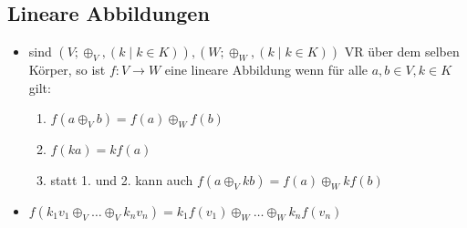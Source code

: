 \documentclass[10pt,a4paper]{article}
\begin{document}
\subsection{Lineare Abbildungen}
\begin{itemize}
\item sind $(V; \oplus_{V}, (k\mid k\in K)),(W; \oplus_{W}, (k\mid k\in K))$ VR über dem selben Körper, so ist $f:V \rightarrow W$ eine lineare Abbildung wenn für alle $a,b\in V,k\in K$ gilt:
\begin{enumerate}
\item $f(a \oplus_{V} b) =f(a)\oplus_{W} f(b)$
\item $f(ka)=kf(a)$
\item statt 1. und 2. kann auch $f(a\oplus_{V} kb)=f(a)\oplus_{W}kf(b)$
\end{enumerate}
\item $f(k_{1}v_{1}\oplus_{V}\dotsc \oplus_{V} k_{n}v_{n})=k_{1}f(v_{1})\oplus_{W}\dotsc\oplus_{W} k_{n}f(v_{n})$ 



\end{itemize}
\end{document}
